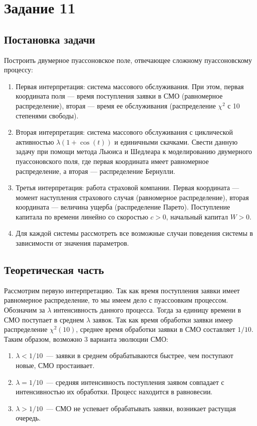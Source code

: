 \documentclass[12pt, a4paper]{article} %
\begin{document}
\section{Задание 11}
\subsection{Постановка задачи}
Построить двумерное пуассоновское поле, отвечающее сложному пуассоновскому процессу:
\begin{enumerate}
	\item Первая интерпретация: система массового обслуживания. При этом, первая координата поля --- время поступления заявки в СМО (равномерное распределение), вторая --- время ее обслуживания (распределение $\chi^2$ с 10 степенями свободы).
	\item Вторая интерпретация: система массового обслуживания с циклической активностью $\lambda(1 + \cos(t))$ и единичными скачками. Свести данную задачу при помощи метода Льюиса и Шедлеара к моделированию двумерного пуассоновского поля, где первая координата имеет равномерное распределение, а вторая --- распределение Бернулли.
	\item Третья интерпретация: работа страховой компании. Первая координата --- момент наступления страхового случая (равномерное распределение), вторая координата --- величина ущерба (распределение Парето). Поступление капитала по времени линейно со скоростью $c > 0$, начальный капитал $W > 0$.
	\item Для каждой системы рассмотреть все возможные случаи поведения системы в зависимости от значения параметров.
\end{enumerate}

\subsection{Теоретическая часть}

Рассмотрим первую интерпретацию.
Так как время поступления заявки имеет равномерное распределение,
то мы имеем дело с пуассоовким процессом.
Обозначим за $\lambda$ интенсивность данного процесса. 
Тогда за единицу времени в СМО поступает в среднем  $\lambda$ заявок.
Так как время обработки заявки имеер распределение $\chi^2(10)$, 
среднее время обработки заявки в СМО составляет $1 / 10$.
Таким образом, возможно 3 варианта эволюции СМО:
\begin{enumerate}
    \item $\lambda < 1 / 10$~--- заявки в среднем обрабатываются быстрее, чем поступают новые, СМО простаивает.
    \item $\lambda = 1 / 10$~--- средняя интенсивность поступления заявом совпадает с интенсивностью их обработки. 
        Процесс находится в равновесии.
    \item $\lambda > 1 / 10$~--- СМО не успевает обрабатывать заявки, возникает растущая очередь.
\end{enumerate} 
\end{document}
